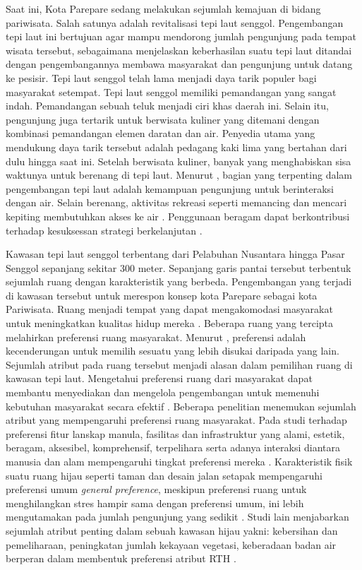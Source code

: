 \documentclass[12pt,oneside]{udthesis}\usepackage[]{graphicx}\usepackage[]{color}
\begin{document}
Saat ini, Kota Parepare sedang melakukan sejumlah kemajuan di bidang pariwisata. Salah satunya adalah revitalisasi tepi laut senggol.
Pengembangan tepi laut ini bertujuan agar mampu mendorong jumlah pengunjung pada tempat wisata tersebut, sebagaimana \cite{hoyle2001} menjelaskan keberhasilan suatu tepi laut ditandai dengan pengembangannya membawa masyarakat dan pengunjung untuk datang ke pesisir.
Tepi laut senggol telah lama menjadi daya tarik populer bagi masyarakat setempat. Tepi laut senggol memiliki pemandangan yang sangat indah. Pemandangan sebuah teluk menjadi ciri khas daerah ini. Selain itu, pengunjung juga tertarik untuk berwisata kuliner yang ditemani dengan kombinasi pemandangan elemen daratan dan air. Penyedia utama yang mendukung daya tarik tersebut adalah pedagang kaki lima yang bertahan dari dulu hingga saat ini. Setelah berwisata kuliner, banyak yang menghabiskan sisa waktunya untuk berenang di tepi laut. Menurut \cite{davidowich1998}, bagian yang terpenting dalam pengembangan tepi laut adalah kemampuan pengunjung untuk berinteraksi dengan air. Selain berenang, aktivitas rekreasi seperti memancing dan mencari kepiting membutuhkan akses ke air \citep{gordon1996}. Penggunaan beragam dapat berkontribusi terhadap kesuksessan strategi berkelanjutan \citep{eldeeb2015}.

Kawasan tepi laut senggol terbentang dari Pelabuhan Nusantara hingga Pasar Senggol sepanjang sekitar 300 meter. Sepanjang garis pantai tersebut terbentuk sejumlah ruang dengan karakteristik yang berbeda. Pengembangan yang terjadi di kawasan tersebut untuk merespon konsep kota Parepare sebagai kota Pariwisata.
Ruang menjadi tempat yang dapat mengakomodasi masyarakat untuk meningkatkan kualitas hidup mereka \citep{kim2012}. Beberapa ruang yang tercipta melahirkan preferensi ruang masyarakat. Menurut \cite{devysandra2012}, preferensi adalah kecenderungan untuk memilih sesuatu yang lebih disukai daripada yang lain. Sejumlah atribut pada ruang tersebut menjadi alasan dalam pemilihan ruang di kawasan tepi laut.
Mengetahui preferensi ruang dari masyarakat dapat membantu menyediakan dan mengelola pengembangan untuk memenuhi kebutuhan masyarakat secara efektif \citep{madureira2018}.
Beberapa penelitian menemukan sejumlah atribut yang mempengaruhi preferensi ruang masyarakat. Pada studi terhadap preferensi fitur lanskap manula, fasilitas dan infrastruktur yang alami, estetik, beragam, aksesibel, komprehensif, terpelihara serta adanya interaksi diantara manusia dan alam mempengaruhi tingkat preferensi mereka \citep{wen2018}. Karakteristik fisik suatu ruang hijau seperti taman dan desain jalan setapak mempengaruhi preferensi umum \textit{general preference}, meskipun preferensi ruang untuk menghilangkan stres hampir sama dengan preferensi umum, ini lebih mengutamakan pada jumlah pengunjung yang sedikit \citep{arnberger2015}. Studi lain menjabarkan sejumlah atribut penting dalam sebuah kawasan hijau yakni: kebersihan dan pemeliharaan, peningkatan jumlah kekayaan vegetasi, keberadaan badan air berperan dalam membentuk preferensi atribut RTH \citep{madureira2018}.
\end{document}
